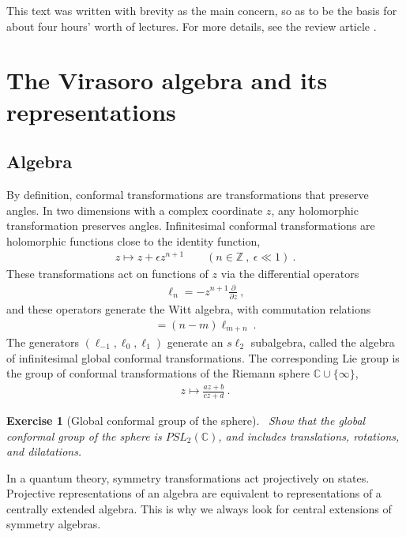 \documentclass[12pt, a4paper]{article}
\theoremstyle{break}
\newtheorem{exo}{Exercise}[section]
\begin{document}
This text was written with brevity as the main concern, so as to be the basis for about four hours' worth of lectures. For more details, see the review article \cite{rib14}.


\section{The Virasoro algebra and its representations}

\subsection{Algebra}

By definition, conformal transformations are transformations that preserve angles. 
In two dimensions with a complex coordinate $z$, any holomorphic transformation preserves angles.
Infinitesimal conformal transformations are holomorphic functions close to the identity function, 
\begin{align}
 z \mapsto z + \epsilon z^{n+1}\qquad (n\in\mathbb{Z}\ , \ \epsilon\ll 1) \ .
\end{align}
These transformations act on functions of $z$ via the differential operators 
\begin{align}
 \ell_n = -z^{n+1}\frac{\partial}{\partial z}\ ,
\end{align}
and these operators generate the Witt algebra, with commutation relations
\begin{align}
 [\ell_n,\ell_m ] = (n-m)\ell_{m+n}\ .
\end{align}
The generators $(\ell_{-1},\ell_0,\ell_1)$ generate an $s\ell_2$ subalgebra, called the algebra of infinitesimal global conformal transformations.  The corresponding Lie group is the group of conformal transformations of 
the Riemann sphere $\mathbb{C}\cup \{\infty\}$,
\begin{align}
 z \mapsto \frac{az+b}{cz+d}\ .
\end{align}

\begin{exo}[Global conformal group of the sphere]
 ~\label{exo:sphere}
Show that the global conformal group of the sphere is $PSL_2(\mathbb{C})$, and includes translations, rotations, and dilatations. 
\end{exo}

In a quantum theory, symmetry transformations act projectively on states. 
Projective representations of an algebra are equivalent to representations of a centrally extended algebra. 
This is why we always look for central extensions of symmetry algebras.
\end{document}
